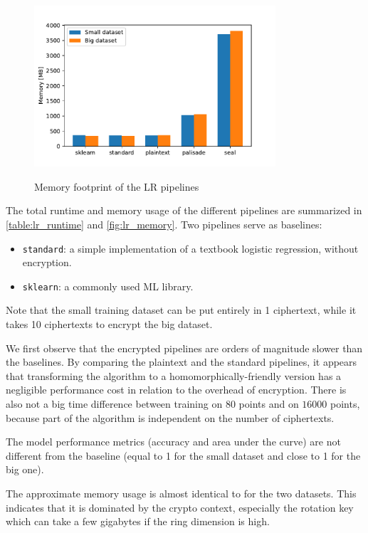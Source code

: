 \documentclass[a4paper,11pt,oneside]{report}
\begin{document}
\begin{figure}[h!]
  \centering
  \caption{Memory footprint of the LR pipelines}
  \includegraphics[width=0.8\textwidth]{figures/lr_mem.pdf}
  \label{fig:lr_memory}
\end{figure}

The total runtime and memory usage of the different pipelines are summarized in \autoref{table:lr_runtime} and \autoref{fig:lr_memory}. 
Two pipelines serve as baselines:
\begin{itemize}
  \item \texttt{standard}: a simple implementation of a textbook logistic regression, without encryption.
  \item \texttt{sklearn}: a commonly used ML library.
\end{itemize}

Note that the small training dataset can be put entirely in 1 ciphertext, while it takes 10 ciphertexts to encrypt the big dataset.

We first observe that the encrypted pipelines are orders of magnitude slower than the baselines.
By comparing the plaintext and the standard pipelines, it appears that transforming the algorithm to a homomorphically-friendly version has a negligible performance cost in relation to the overhead of encryption.
There is also not a big time difference between training on $80$ points and on $16000$ points, because part of the algorithm is independent on the number of ciphertexts.

The model performance metrics (accuracy and area under the curve) are not different from the baseline (equal to 1 for the small dataset and close to 1 for the big one).

The approximate memory usage is almost identical to for the two datasets.
This indicates that it is dominated by the crypto context, especially the rotation key which can take a few gigabytes if the ring dimension is high. 
\end{document}
